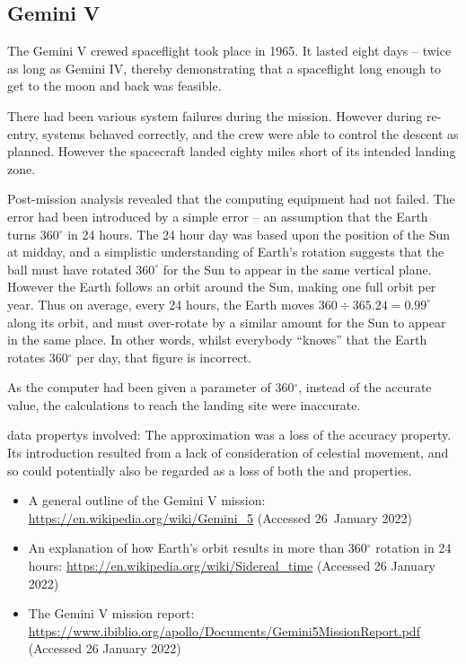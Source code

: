\subsection{Gemini V}\label{bkm:incacc:geminiV}
The Gemini V crewed spaceflight took place in 1965. It lasted eight days -- twice as long as Gemini IV, thereby demonstrating that a spaceflight long enough to get to the moon and back was feasible.

There had been various system failures during the mission. However during re-entry, systems behaved correctly, and the crew were able to control the descent as planned. However the spacecraft landed eighty miles short of its intended landing zone.

Post-mission analysis revealed that the computing equipment had not failed. The error had been introduced by a simple \gls{error} --
an assumption that the Earth turns 360$^\circ$ in 24 hours. The 24 hour day was based upon the position of the Sun at midday,
and a simplistic understanding of Earth's rotation suggests that the ball must have rotated $360^\circ$ for the Sun to appear in the same vertical plane. However the Earth follows an orbit around the Sun, making one full orbit per year.
Thus on average, every 24 hours, the Earth moves $360\div 365.24 = 0.99^\circ$ along its orbit,
and must over-rotate by a similar amount for the Sun to appear in the same place.
In other words, whilst everybody ``knows'' that the Earth rotates 360$^\circ$ per day, that figure is incorrect.

As the computer had been given a parameter of 360$^\circ$, instead of the accurate value, the calculations to reach the landing site were inaccurate.

\Glspl{data property} involved: The approximation was a loss of the \gls{accuracy} property.
Its introduction resulted from a lack of consideration of celestial movement,
and so could potentially also be regarded as a loss of both the  and  properties.

\begin{itemize}
\item A general outline of the Gemini V mission:
  \href{https://en.wikipedia.org/wiki/Gemini\_5}
       {https://en.wikipedia.org/wiki/Gemini\_5}
       (Accessed 26~January 2022)
     \item An explanation of how Earth's orbit results in more than 360$^\circ$ rotation in 24 hours: 
       \href{https://en.wikipedia.org/wiki/Sidereal\_time}
            {https://en.wikipedia.org/wiki/Sidereal\_time}
       (Accessed 26 January 2022)
          \item The Gemini V mission report:
            \href{https://www.ibiblio.org/apollo/Documents/Gemini5MissionReport.pdf}
                 {https://www.ibiblio.org/apollo/Documents/Gemini5MissionReport.pdf}
       (Accessed 26 January 2022)
\end{itemize}

